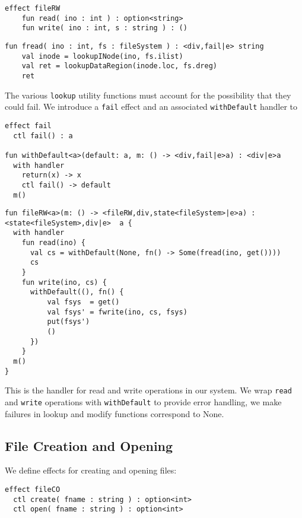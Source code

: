 \documentclass[logo,bsc,singlespacing,parskip]{infthesis}
\begin{document}
\begin{lstlisting}
effect fileRW
    fun read( ino : int ) : option<string>
    fun write( ino : int, s : string ) : ()
\end{lstlisting}



\begin{lstlisting}
fun fread( ino : int, fs : fileSystem ) : <div,fail|e> string
    val inode = lookupINode(ino, fs.ilist)
    val ret = lookupDataRegion(inode.loc, fs.dreg)
    ret
\end{lstlisting}

The various \texttt{lookup} utility functions must account for the possibility that they could fail. We introduce a \texttt{fail} effect and an associated \texttt{withDefault} handler to 

\begin{lstlisting}
effect fail
  ctl fail() : a

fun withDefault<a>(default: a, m: () -> <div,fail|e>a) : <div|e>a
  with handler
    return(x) -> x
    ctl fail() -> default
  m()
\end{lstlisting}

\begin{lstlisting}
fun fileRW<a>(m: () -> <fileRW,div,state<fileSystem>|e>a) : <state<fileSystem>,div|e>  a {
  with handler
    fun read(ino) {
      val cs = withDefault(None, fn() -> Some(fread(ino, get())))
      cs
    }
    fun write(ino, cs) {
      withDefault((), fn() {
          val fsys  = get()
          val fsys' = fwrite(ino, cs, fsys)
          put(fsys')
          ()
      })
    }
  m()
}
\end{lstlisting}

This is the handler for read and write operations in our system. We wrap \texttt{read} and \texttt{write} operations with \texttt{withDefault} to provide error handling, we make failures in lookup and modify functions correspond to None.

\subsection{File Creation and Opening}

We define effects for creating and opening files:

\begin{lstlisting}
effect fileCO
  ctl create( fname : string ) : option<int>
  ctl open( fname : string ) : option<int>
\end{lstlisting}
\end{document}
